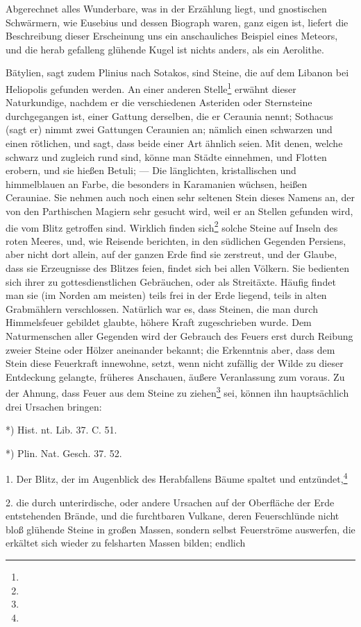 \documentclass[a4paper, 11pt, oneside, polutonikogreek, german]{article}
\begin{document}
Abgerechnet alles Wunderbare, was in der Erzählung liegt, und gnostischen Schwärmern, wie Eusebius und dessen Biograph waren, ganz eigen ist, liefert die Beschreibung dieser Erscheinung uns ein anschauliches Beispiel eines Meteors, und die herab gefalleng glühende Kugel ist nichts anders, als ein Aerolithe.

Bätylien, sagt zudem Plinius nach Sotakos, sind Steine, die auf dem Libanon bei Heliopolis gefunden werden. An einer anderen Stelle\footnote{} erwähnt dieser Naturkundige, nachdem er die verschiedenen Asteriden oder Sternsteine durchgegangen ist, einer Gattung derselben, die er Ceraunia nennt; Sothacus (sagt er) nimmt zwei Gattungen Ceraunien an; nämlich einen schwarzen und einen rötlichen, und sagt, dass beide einer Art ähnlich seien. Mit denen, welche schwarz und zugleich rund sind, könne man Städte einnehmen, und Flotten erobern, und sie hießen Betuli; --- Die länglichten, kristallischen und himmelblauen an Farbe, die besonders in Karamanien wüchsen, heißen Cerauniae. Sie nehmen auch noch einen sehr seltenen Stein dieses Namens an, der von den Parthischen Magiern sehr gesucht wird, weil er an Stellen gefunden wird, die vom Blitz getroffen sind. Wirklich finden sich\footnote{} solche Steine auf Inseln des roten Meeres, und, wie Reisende berichten, in den südlichen Gegenden Persiens, aber nicht dort allein, auf der ganzen Erde find sie zerstreut, und der Glaube, dass sie Erzeugnisse des Blitzes feien, findet sich bei allen Völkern. Sie bedienten sich ihrer zu gottesdienstlichen Gebräuchen, oder als Streitäxte. Häufig findet man sie (im Norden am meisten) teils frei in der Erde liegend, teils in alten Grabmählern verschlossen. Natürlich war es, dass Steinen, die man durch Himmelsfeuer gebildet glaubte, höhere Kraft zugeschrieben wurde. Dem Naturmenschen aller Gegenden wird der Gebrauch des Feuers erst durch Reibung zweier Steine oder Hölzer aneinander bekannt; die Erkenntnis aber, dass dem Stein diese Feuerkraft innewohne, setzt, wenn nicht zufällig der Wilde zu dieser Entdeckung gelangte, früheres Anschauen, äußere Veranlassung zum voraus. Zu der Ahnung, dass Feuer aus dem Steine zu ziehen\footnote{} sei, können ihn hauptsächlich drei Ursachen bringen:

*) Hist. nt. Lib. 37. C. 51.

*) Plin. Nat. Gesch. 37. 52.

1. Der Blitz, der im Augenblick des Herabfallens Bäume spaltet und entzündet,\footnote{}

2. die durch unterirdische, oder andere Ursachen auf der Oberfläche der Erde entstehenden Brände, und die furchtbaren Vulkane, deren Feuerschlünde nicht bloß glühende Steine in großen Massen, sondern selbst Feuerströme auswerfen, die erkältet sich wieder zu felsharten Massen bilden; endlich
\end{document}
